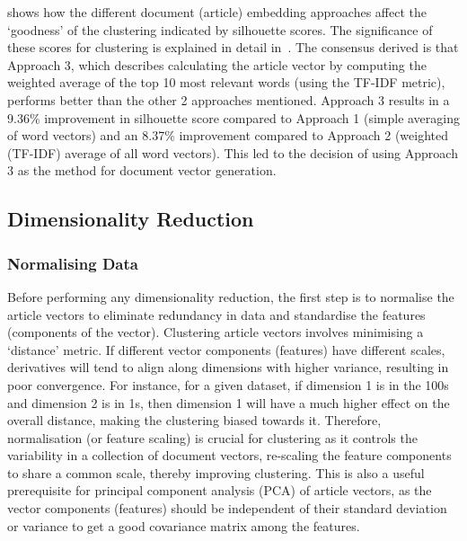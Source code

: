  shows how the different document (article) embedding approaches affect the `goodness' of the clustering indicated by silhouette scores. The significance of these scores for clustering is explained in detail in~. The consensus derived is that Approach 3, which describes calculating the article vector by computing the weighted average of the top 10 most relevant words (using the TF-IDF metric), performs better than the other 2 approaches mentioned. Approach 3 results in a 9.36\% improvement in silhouette score compared to Approach 1 (simple averaging of word vectors) and an 8.37\% improvement compared to Approach 2 (weighted (TF-IDF) average of all word vectors). This led to the decision of using Approach 3 as the method for document vector generation.



\subsection{Dimensionality Reduction}

\subsubsection{Normalising Data}

Before performing any dimensionality reduction, the first step is to normalise the article vectors to eliminate redundancy in data and standardise the features (components of the vector). Clustering article vectors involves minimising a `distance' metric. If different vector components (features) have different scales, derivatives will tend to align along dimensions with higher variance, resulting in poor convergence. For instance, for a given dataset, if dimension 1 is in the 100s and dimension 2 is in 1s, then dimension 1 will have a much higher effect on the overall distance, making the clustering biased towards it. Therefore, normalisation (or feature scaling) is crucial for clustering as it controls the  variability in a collection of document vectors, re-scaling the feature components to share a common scale, thereby improving clustering. This is also a useful prerequisite for principal component analysis (PCA) of article vectors, as the vector components (features) should be independent of their standard deviation or variance to get a good covariance matrix among the features.   

